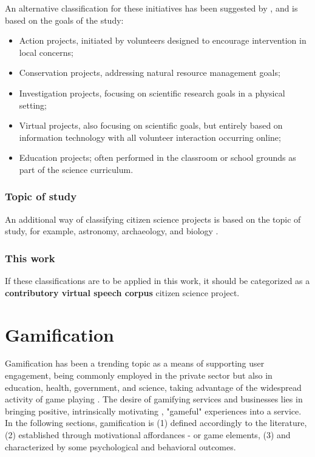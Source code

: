 An alternative classification for these initiatives has been suggested by \cite{wiggins2011conservation}, and is based on the goals of the study:

\begin{itemize}
    \item Action projects, initiated by volunteers designed to encourage intervention in local concerns;
    \item Conservation projects, addressing natural resource management goals;
    \item Investigation projects, focusing on scientific research goals in a physical setting;
    \item Virtual projects, also focusing on scientific goals, but entirely based on information technology with all volunteer interaction occurring online;
    \item Education projects; often performed in the classroom or school grounds as part of the science curriculum.
\end{itemize}

\subsubsection*{Topic of study}

An additional way of classifying citizen science projects is based on the topic of study, for example, astronomy, archaeology, and biology \cite{wiggins2011conservation}. 

\subsubsection*{This work}

If these classifications are to be applied in this work, it should be categorized as a \textbf{contributory virtual speech corpus} citizen science project.

\section{Gamification}

Gamification has been a trending topic as a means of supporting user engagement, being commonly employed in the private sector but also in education, health, government, and science, taking advantage of the widespread activity of game playing \cite{kreitmair2019citizen}. The desire of gamifying services and businesses lies in bringing positive, intrinsically motivating \cite{ryan2000self}, "gameful" experiences \cite{huotari2012defining} into a service. In the following sections, gamification is (1) defined accordingly to the literature, (2) established through motivational affordances - or game elements, (3) and characterized by some psychological and behavioral outcomes.

